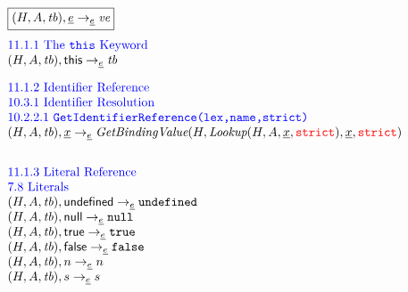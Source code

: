 \documentclass[a4paper, leqno]{amsart}
\newcommand{\expr}{e}
\newcommand{\ir}[1]{\ensuremath{\underline{#1}}}
\newcommand{\irid}{\ir{x}}
\def\inred{\color{red}}
\def\inblue{\color{blue}}
\newcommand{\strict}{{\inred\tt strict}}
\newcommand{\nullK}{{\tt null}}
\newcommand{\undef}{{\tt undefined}}
\newcommand{\false}{{\tt false}}
\newcommand{\true}{{\tt true}}
\newcommand{\tb}{\emph{tb}}
\newcommand{\hf}[1]{\emph{#1}}
\newcommand{\evale}{\ensuremath{(H,A,\tb)}}
\def\inred{\color{red}}
\def\inblue{\color{blue}}
\begin{document}
\[
\begin{array}{l@{~~}l@{~~}ll}
\fbox{$\evale,\ir{\expr} \rightarrow_{\ir\expr} \emph{ve}$}\\[1em]
\mbox{\inblue 11.1.1 The {\tt this} Keyword}\\
\evale, {\sf this} \rightarrow_{\ir\expr} \tb\\[1em]

\mbox{\inblue 11.1.2 Identifier Reference}\\
\mbox{\inblue 10.3.1 Identifier Resolution}\\
\mbox{\inblue 10.2.2.1 {\tt GetIdentifierReference(lex,name,strict)}}\\


\evale, \irid \rightarrow_{\ir\expr} \hf{GetBindingValue}(H,\hf{Lookup}(H,A,\irid,\strict), \irid, \strict)
\\[2em]

\mbox{\inblue 11.1.3 Literal Reference}\\
\mbox{\inblue 7.8 Literals}\\
\evale, {\sf undefined} \rightarrow_{\ir\expr} \undef\\
\evale, {\sf null} \rightarrow_{\ir\expr} \nullK\\
\evale, {\sf true} \rightarrow_{\ir\expr} \true\\
\evale, {\sf false} \rightarrow_{\ir\expr} \false\\
\evale, n \rightarrow_{\ir\expr} n\\
\evale, s \rightarrow_{\ir\expr} s\\
\end{array}
\]
\end{document}
